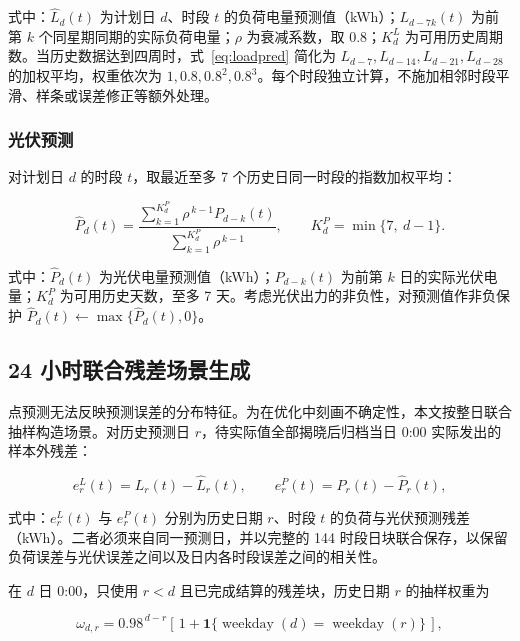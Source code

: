 式中：$\widehat{L}_d(t)$ 为计划日 $d$、时段 $t$ 的负荷电量预测值（kWh）；$L_{d-7k}(t)$ 为前第 $k$ 个同星期同期的实际负荷电量；$\rho$ 为衰减系数，取 0.8；$K^L_d$ 为可用历史周期数。当历史数据达到四周时，式~\eqref{eq:loadpred} 简化为 $L_{d-7},L_{d-14},L_{d-21},L_{d-28}$ 的加权平均，权重依次为 $1,0.8,0.8^2,0.8^3$。每个时段独立计算，不施加相邻时段平滑、样条或误差修正等额外处理。

\subsubsection{光伏预测}

对计划日 $d$ 的时段 $t$，取最近至多 7 个历史日同一时段的指数加权平均：

\begin{equation}
  \widehat{P}_d(t) = \frac{\displaystyle\sum_{k=1}^{K^P_d} \rho^{\,k-1} P_{d-k}(t)}{\displaystyle\sum_{k=1}^{K^P_d} \rho^{\,k-1}},
  \qquad
  K^P_d = \min\{7,\ d-1\}.
  \label{eq:pvpred}
\end{equation}

式中：$\widehat{P}_d(t)$ 为光伏电量预测值（kWh）；$P_{d-k}(t)$ 为前第 $k$ 日的实际光伏电量；$K^P_d$ 为可用历史天数，至多 7 天。考虑光伏出力的非负性，对预测值作非负保护 $\widehat{P}_d(t) \leftarrow \max\{\widehat{P}_d(t), 0\}$。

\subsection{24 小时联合残差场景生成}

点预测无法反映预测误差的分布特征。为在优化中刻画不确定性，本文按整日联合抽样构造场景\cite{ref3}。对历史预测日 $r$，待实际值全部揭晓后归档当日 0:00 实际发出的样本外残差：

\begin{equation}
  e^L_r(t) = L_r(t) - \widehat{L}_r(t), \qquad e^P_r(t) = P_r(t) - \widehat{P}_r(t),
  \label{eq:residual}
\end{equation}

式中：$e^L_r(t)$ 与 $e^P_r(t)$ 分别为历史日期 $r$、时段 $t$ 的负荷与光伏预测残差（kWh）。二者必须来自同一预测日，并以完整的 144 时段日块联合保存，以保留负荷误差与光伏误差之间以及日内各时段误差之间的相关性。

在 $d$ 日 0:00，只使用 $r<d$ 且已完成结算的残差块，历史日期 $r$ 的抽样权重为

\begin{equation}
  \omega_{d,r} = 0.98^{\,d-r} \left[\, 1 + \mathbf{1}\{\operatorname{weekday}(d) = \operatorname{weekday}(r)\} \,\right],
  \label{eq:weight}
\end{equation}

